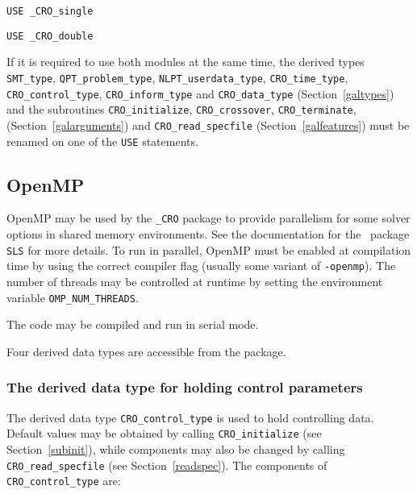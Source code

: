 \documentclass{galahad}
\newcommand{\packagename}{CRO}
\newcommand{\fullpackagename}{\libraryname\_\packagename}
\begin{document}
\hspace{8mm} {\tt USE \fullpackagename\_single}

\medskip{}

\hspace{8mm} {\tt USE  \fullpackagename\_double}

\medskip

\noindent
If it is required to use both modules at the same time, the derived types
{\tt SMT\_type},
{\tt QPT\_problem\_type},
{\tt NLPT\_user\-data\-\_type},
{\tt \packagename\_time\_type},
{\tt \packagename\_control\_type},
{\tt \packagename\_inform\_type}
and
{\tt \packagename\_data\_type}
(Section~\ref{galtypes})
and the subroutines
{\tt \packagename\_initialize},
{\tt \packagename\_\-crossover},
{\tt \packagename\_terminate},
(Section~\ref{galarguments})
and
{\tt \packagename\_read\_specfile}
(Section~\ref{galfeatures})
must be renamed on one of the {\tt USE} statements.


\subsection{OpenMP}
OpenMP may be used by the {\tt \fullpackagename} package to provide
parallelism for some solver options in shared memory environments.
See the documentation for the \galahad\ package {\tt SLS} for more details.
To run in parallel, OpenMP
must be enabled at compilation time by using the correct compiler flag
(usually some variant of {\tt -openmp}).
The number of threads may be controlled at runtime
by setting the environment variable {\tt OMP\_NUM\_THREADS}.

\noindent
The code may be compiled and run in serial mode.


\galtypes
Four derived data types are accessible from the package.


\subsubsection{The derived data type for holding control
 parameters}\label{typecontrol}
The derived data type
{\tt \packagename\_control\_type}
is used to hold controlling data. Default values may be obtained by calling
{\tt \packagename\_initialize}
(see Section~\ref{subinit}),
while components may also be changed by calling
{\tt \packagename\_read\-\_specfile}
(see Section~\ref{readspec}).
The components of
{\tt \packagename\_control\_type}
are:
\end{document}
